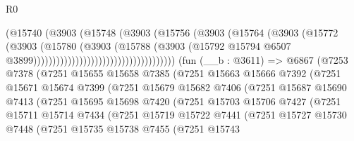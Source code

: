 \begin{lexlean}{R0}
\begin{coremodule}
                                                (@15740
                                                  (@3903
                                                    (@15748
                                                      (@3903
                                                        (@15756
                                                          (@3903
                                                            (@15764
                                                              (@3903
                                                                (@15772
                                                                  (@3903
                                                                    (@15780
                                                                      (@3903
                                                                        (@15788
                                                                          (@3903
                                                                            (@15792
                                                                              @15794
                                                                              @6507
                                                                              @3899)))))))))))))))))))))))))))))))))))))
    (fun (__b : @3611) =>
    @6867
      (@7253
        @7378
        (@7251
          @15655
          @15658
          @7385
          (@7251
            @15663
            @15666
            @7392
            (@7251
              @15671
              @15674
              @7399
              (@7251
                @15679
                @15682
                @7406
                (@7251
                  @15687
                  @15690
                  @7413
                  (@7251
                    @15695
                    @15698
                    @7420
                    (@7251
                      @15703
                      @15706
                      @7427
                      (@7251
                        @15711
                        @15714
                        @7434
                        (@7251
                          @15719
                          @15722
                          @7441
                          (@7251
                            @15727
                            @15730
                            @7448
                            (@7251
                              @15735
                              @15738
                              @7455
                              (@7251
                                @15743

\end{coremodule}
\end{lexlean}
